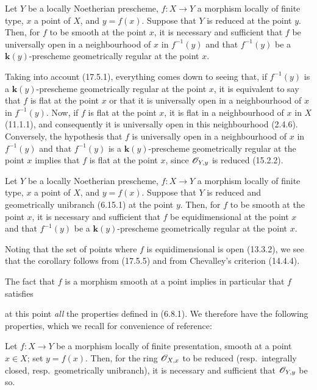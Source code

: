 \begin{proposition}[17.5.5]
\label{IV.17.5.5}
Let $Y$ be a locally Noetherian prescheme, $f:X\to Y$ a morphism locally of finite type, $x$ a point of $X$, and $y=f(x)$. Suppose that $Y$ is \textup{reduced} at the point $y$. Then, for $f$ to be smooth at the point $x$, it is necessary and sufficient that $f$ be universally open in a neighbourhood of $x$ in $f^{-1}(y)$ and that $f^{-1}(y)$ be a $\boldsymbol{k}(y)$-prescheme geometrically regular at the point $x$.
\end{proposition}

Taking into account (17.5.1), everything comes down to seeing that, if $f^{-1}(y)$ is a $\boldsymbol{k}(y)$-prescheme geometrically regular at the point $x$, it is equivalent to say that $f$ is flat at the point $x$ or that it is universally open in a neighbourhood of $x$ in $f^{-1}(y)$. Now, if $f$ is flat at the point $x$, it is flat in a neighbourhood of $x$ in $X$ (11.1.1), and consequently it is universally open in this neighbourhood (2.4.6). Conversely, the hypothesis that $f$ is universally open in a neighbourhood of $x$ in $f^{-1}(y)$ and that $f^{-1}(y)$ is a $\boldsymbol{k}(y)$-prescheme geometrically regular at the point $x$ implies that $f$ is flat at the point $x$, since $\mathscr{O}_{Y,y}$ is reduced (15.2.2).

\begin{corollary}[17.5.6]
\label{IV.17.5.6}
Let $Y$ be a locally Noetherian prescheme, $f:X\to Y$ a morphism locally of finite type, $x$ a point of $X$, and $y=f(x)$. Suppose that $Y$ is \textup{reduced} and \textup{geometrically unibranch (6.15.1)} at the point $y$. Then, for $f$ to be smooth at the point $x$, it is necessary and sufficient that $f$ be equidimensional at the point $x$ and that $f^{-1}(y)$ be a $\boldsymbol{k}(y)$-prescheme geometrically regular at the point $x$.
\end{corollary}

Noting that the set of points where $f$ is equidimensional is open (13.3.2), we see that the corollary follows from (17.5.5) and from Chevalley's criterion (14.4.4).

The fact that $f$ is a morphism smooth at a point implies in particular that $f$ satisfies

at this point \emph{all} the properties defined in (6.8.1). We therefore have the following properties, which we recall for convenience of reference:

\begin{proposition}[17.5.7]
\label{IV.17.5.7}
Let $f:X\to Y$ be a morphism locally of finite presentation, smooth at a point $x\in X$; set $y=f(x)$. Then, for the ring $\mathscr{O}_{X,x}$ to be reduced \textup{(resp.}\ integrally closed, \textup{resp.}\ geometrically unibranch\textup{)}, it is necessary and sufficient that $\mathscr{O}_{Y,y}$ be so.
\end{proposition}

